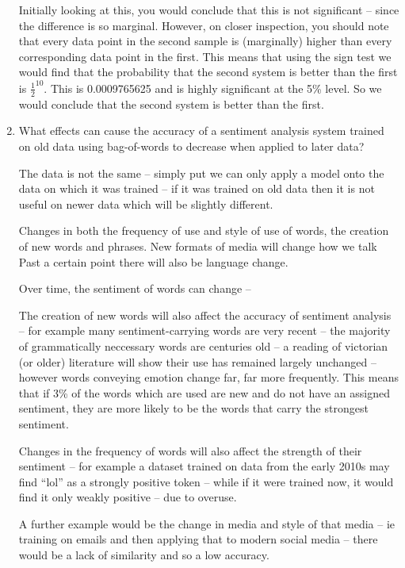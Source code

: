 \documentclass[10pt,\jkfside,a4paper]{article}
\begin{document}
\begin{enumerate}
Initially looking at this, you would conclude that this is not significant -- since the difference is so marginal. 
However, on closer inspection, you should note that every data point in the second sample is (marginally) higher 
than every corresponding data point in the first. This means that using the sign test we would find that 
the probability that the second system is better than the first is $\frac{1}{2}^{10}$. This is 0.0009765625 and is highly 
significant at the 5\% level. So we would conclude that the second system is better than the first.

\item What effects can cause the accuracy of a sentiment analysis system trained
on old data using bag-of-words to decrease when applied to later data?

The data is not the same -- simply put we can only apply a model onto the data on which it was trained 
-- if it was trained on old data then it is not useful on newer data which will be slightly different.

Changes in both the frequency of use and style of use of words, the creation of new words and phrases. 
New formats of media will change how we talk
Past a certain point there will also be language change. 

Over time, the sentiment of words can change -- 

The creation of new words will also affect the accuracy of sentiment analysis -- for example many sentiment-carrying 
words are very recent -- the majority of grammatically neccessary words are centuries old -- a reading of 
victorian (or older) literature will show their use has remained largely unchanged -- however words conveying emotion 
change far, far more frequently. This means that if 3\% of the words which are used are new and do not have an 
assigned sentiment, they are more likely to be the words that carry the strongest sentiment.

Changes in the frequency of words will also affect the strength of their sentiment -- for example a dataset trained 
on data from the early 2010s may find ``lol'' as a strongly positive token -- while if it were trained now, it would 
find it only weakly positive -- due to overuse.

A further example would be the change in media and style of that media -- ie training on emails and then 
applying that to modern social media -- there would be a lack of similarity and so a low accuracy.

\end{enumerate}
\end{document}
